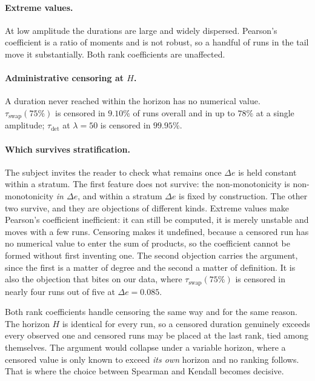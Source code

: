 \documentclass[11pt,a4paper]{article}
\begin{document}
\paragraph{Extreme values.} At low amplitude the durations are large and widely dispersed.
Pearson's coefficient is a ratio of moments and is not robust, so a handful of runs in the
tail move it substantially. Both rank coefficients are unaffected.

\paragraph{Administrative censoring at $H$.} A duration never reached within the horizon
has no numerical value. $\tau_{\mathrm{swap}}(75\%)$ is censored in $9.10\%$ of runs
overall and in up to $78\%$ at a single amplitude; $\tau_{\mathrm{det}}$ at $\lambda = 50$
is censored in $99.95\%$.

\paragraph{Which survives stratification.} The subject invites the reader to check what
remains once $\Delta e$ is held constant within a stratum. The first feature does not
survive: the non-monotonicity is non-monotonicity \emph{in $\Delta e$}, and within a
stratum $\Delta e$ is fixed by construction. The other two survive, and they are objections
of different kinds. Extreme values make Pearson's coefficient inefficient: it can still be
computed, it is merely unstable and moves with a few runs. Censoring makes it undefined,
because a censored run has no numerical value to enter the sum of products, so the
coefficient cannot be formed without first inventing one. The second objection carries the
argument, since the first is a matter of degree and the second a matter of definition. It
is also the objection that bites on our data, where $\tau_{\mathrm{swap}}(75\%)$ is
censored in nearly four runs out of five at $\Delta e = 0.085$.

Both rank coefficients handle censoring the same way and for the same reason. The horizon
$H$ is identical for every run, so a censored duration genuinely exceeds every observed
one and censored runs may be placed at the last rank, tied among themselves. The argument
would collapse under a variable horizon, where a censored value is only known to exceed
\emph{its own} horizon and no ranking follows. That is where the choice between Spearman
and Kendall becomes decisive.
\end{document}
